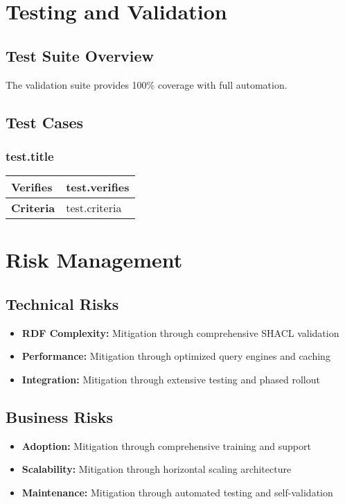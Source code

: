 \documentclass[11pt,a4paper]{article}
\begin{document}
{{{{{{%
\section{Testing and Validation}

\subsection{Test Suite Overview}
The validation suite provides 100\% coverage with full automation.

\subsection{Test Cases}
{%
\subsubsection{{{ test.title }}}
\begin{tabular}{|p{3cm}|p{10cm}|}
\hline
\textbf{Verifies} & {{ test.verifies }} \\
\hline
\textbf{Criteria} & {{ test.criteria }} \\
\hline
\end{tabular}

{%

\section{Risk Management}

\subsection{Technical Risks}
\begin{itemize}[leftmargin=2cm]
    \item \textbf{RDF Complexity:} Mitigation through comprehensive SHACL validation
    \item \textbf{Performance:} Mitigation through optimized query engines and caching
    \item \textbf{Integration:} Mitigation through extensive testing and phased rollout
\end{itemize}

\subsection{Business Risks}
\begin{itemize}[leftmargin=2cm]
    \item \textbf{Adoption:} Mitigation through comprehensive training and support
    \item \textbf{Scalability:} Mitigation through horizontal scaling architecture
    \item \textbf{Maintenance:} Mitigation through automated testing and self-validation
\end{itemize}

}}}}}}}}
\end{document}

